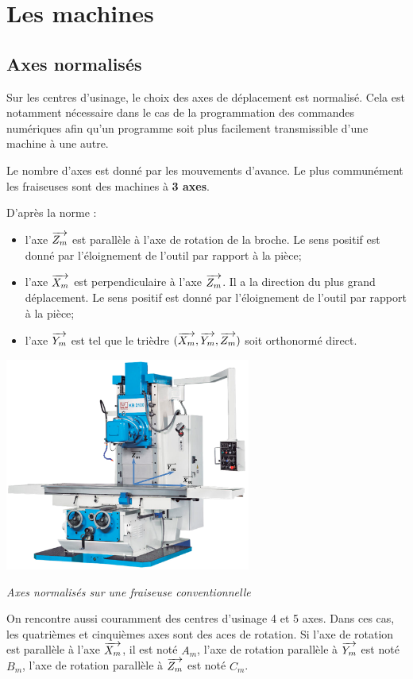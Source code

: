 \documentclass[11pt,oneside]{article}
\begin{document}
\section{Les machines}
\subsection{Axes normalisés}
Sur les centres d'usinage, le choix des axes de déplacement est normalisé. Cela est notamment nécessaire dans le cas de la programmation des commandes numériques afin qu'un programme soit plus facilement transmissible d'une machine à une autre. 

Le nombre d'axes est donné par les mouvements d'avance. Le plus communément les fraiseuses sont des machines à \textbf{3 axes}.

D'après la norme :
\begin{itemize}
\item l'axe $\overrightarrow{Z_m}$ est parallèle à l'axe de rotation de la broche. Le sens positif est donné par l'éloignement de l'outil par rapport à la pièce;
\item l'axe $\overrightarrow{X_m}$ est perpendiculaire à l'axe $\overrightarrow{Z_m}$. Il a la direction du plus grand déplacement. Le sens positif est donné par l'éloignement de l'outil par rapport à la pièce;
\item l'axe $\overrightarrow{Y_m}$ est tel que le trièdre $(\overrightarrow{X_m},\overrightarrow{Y_m},\overrightarrow{Z_m})$ soit orthonormé direct. 
\end{itemize}


\begin{center}
\includegraphics[height=7cm]{png/axes_normalises}

\textit{Axes normalisés sur une fraiseuse conventionnelle}
\end{center}


On rencontre aussi couramment des centres d'usinage 4 et 5 axes. Dans ces cas, les quatrièmes et cinquièmes axes sont des aces de rotation. Si l'axe de rotation est parallèle à l'axe $\overrightarrow{X_m}$, il est noté $A_m$, l'axe de rotation parallèle à $\overrightarrow{Y_m}$ est noté $B_m$, l'axe de rotation parallèle à $\overrightarrow{Z_m}$ est noté $C_m$.
\end{document}
